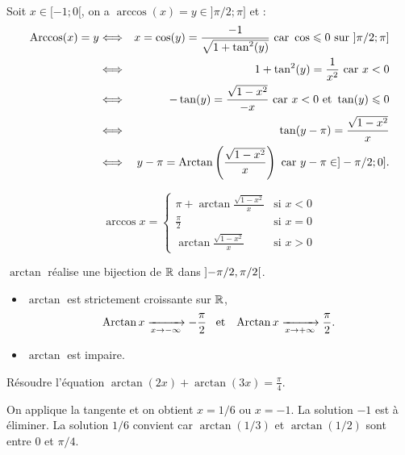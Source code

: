 \documentclass{magnolia}
\begin{document}
\begin{exos}
\begin{sol}
\begin{itemize}
  Soit $x\in [-1;0[$, on a $\arccos(x)=y \in ]\pi/2;\pi]$ et :
  \begin{eqnarray*}
  \operatorname{Arccos}(x)=y &\Longleftrightarrow & x=\cos(y)=\dfrac{-1}{\sqrt{1+\tan^2(y)}} \text{ car } \cos\leqslant 0 \text{ sur } ]\pi/2;\pi]\\
&\Longleftrightarrow & 1+\tan^2(y)=\dfrac{1}{x^2} \text{ car } x<0\\
&\Longleftrightarrow & -\tan(y)=\frac{\sqrt{1-x^2}}{-x} \text{ car } x<0 \text{ et } \tan(y)\leqslant 0\\
&\Longleftrightarrow & \tan(y-\pi)=\frac{\sqrt{1-x^2}}{x}\\
&\Longleftrightarrow & y-\pi=\operatorname{Arctan}\left(\frac{\sqrt{1-x^2}}{x}\right) \text{ car } y-\pi \in ]-\pi/2;0].
  \end{eqnarray*}
    
    \[\arccos x=
    \begin{cases}
    \pi+\arctan\frac{\sqrt{1-x^2}}{x} & \text{si $x<0$}\\
    \frac{\pi}{2} & \text{si $x=0$}\\
    \arctan\frac{\sqrt{1-x^2}}{x} & \text{si $x>0$}
    \end{cases}\]
    
   \end{itemize}
  \end{sol}
\end{exos}

\begin{proposition}[utile=-3]
$\arctan$ réalise une bijection de $\mathbb{R}$ dans $\left]-\pi/2,\pi/2\right[$.
\end{proposition}

\begin{proposition}[utile=-3]
\begin{itemize}
\item $\arctan$ est strictement croissante sur $\mathbb{R}$,
  \[\operatorname{Arctan} x\xrightarrow[x\rightarrow -\infty]{}-\frac{\pi}{2} \quad\!\text{et}\quad\!
    \operatorname{Arctan} x\xrightarrow[x\rightarrow +\infty]{} \frac{\pi}{2}.\]
\item $\arctan$ est impaire.
\end{itemize}
\end{proposition}

\begin{exoUnique}
\exemple Résoudre l'équation $\arctan(2x)+\arctan(3x)=\frac{\pi}{4}$.
  \begin{sol}
  On applique la tangente et on obtient $x=1/6$ ou $x=-1$. La solution $-1$
  est à éliminer. La solution $1/6$ convient car $\arctan(1/3)$ et
  $\arctan(1/2)$ sont entre 0 et $\pi/4$.
  \end{sol}  
\end{exoUnique}
\end{document}
